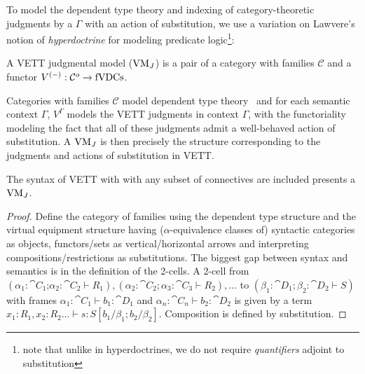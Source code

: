\documentclass{llncs}
\begin{document}
To model the dependent type theory and indexing of category-theoretic
judgments by a $\Gamma$ with an action of substitution, we use a
variation on Lawvere's notion of \emph{hyperdoctrine} for modeling
predicate logic\cite{Lawvere69}\footnote{note that unlike in
hyperdoctrines, we do not require \emph{quantifiers} adjoint to
substitution}:
\begin{definition}
  A VETT judgmental model ($\textrm{VM}_J$) is a pair of a category with
  families $\mathcal C$ and a functor $V^{(-)} : \mathcal C^o \to
  \textrm{fVDCs}$.
\end{definition}
Categories with families $\mathcal C$ model dependent type
theory~\cite{dybjer-cwf} and for each semantic context $\Gamma$,
$V^\Gamma$ models the VETT judgments in context $\Gamma$, with the
functoriality modeling the fact that all of these judgments admit a
well-behaved action of substitution.
A $\textrm{VM}_J$ is then precisely the structure corresponding to the
judgments and actions of substitution in VETT.
\begin{construction}
  \label{cons:syn-model}
  The syntax of VETT with with any subset of connectives are included
  presents a $\textrm{VM}_J$.
\end{construction}
\begin{proof}
  Define the category of families using the dependent
  type structure and the virtual equipment structure having
  ($\alpha$-equivalence classes of) syntactic categories as objects,
  functors/sets as vertical/horizontal arrows and interpreting
  compositions/restrictions as substitutions.  The biggest gap between syntax and semantics is in the
  definition of the 2-cells.  A 2-cell from\\ $(\alpha_1:\cat
  C_1\mathord{;}\alpha_2:\cat C_2\vdash R_1),(\alpha_2:\cat
  C_2;\alpha_3:\cat C_3 \vdash R_2),\ldots$ to $(\beta_1:\cat
  D_1;\beta_2 : \cat D_2\vdash S)$ with frames $\alpha_1:\cat C_1\vdash b_1 : \cat
  D_1$ and $\alpha_n:\cat C_n\vdash b_2 : \cat D_2$ is given by a term
  $x_1:R_1,x_2:R_2\ldots \vdash s :
  S[b_1/\beta_1;b_2/\beta_2]$. Composition is defined by substitution.
\end{proof}
\end{document}
